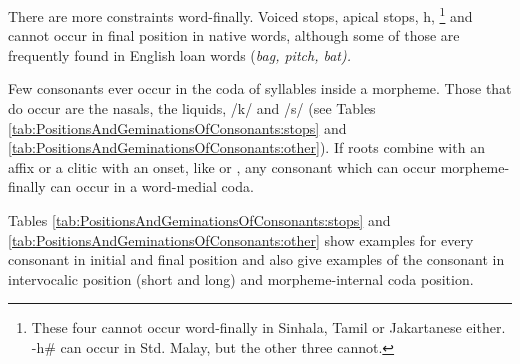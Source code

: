 There are more constraints word-finally. Voiced stops, apical stops,  h, \ny{}\footnote{These four cannot occur word-finally in Sinhala, Tamil or Jakartanese either. -h\# can occur in Std. Malay, but the other three cannot.} and \V{}  cannot occur in final position in native words, although some of those are frequently found in English loan words (\em bag, pitch, bat\em).

Few consonants ever occur in the coda of syllables inside a morpheme. Those that do occur are the nasals, the liquids, /k/ and /s/ (see Tables \ref{tab:PositionsAndGeminationsOfConsonants:stops} and \ref{tab:PositionsAndGeminationsOfConsonants:other}). If roots combine with an affix or a clitic with an onset, like  or , any consonant which can occur morpheme-finally can occur in a word-medial coda.

Tables \ref{tab:PositionsAndGeminationsOfConsonants:stops} and \ref{tab:PositionsAndGeminationsOfConsonants:other} show examples for every consonant in initial and final position and also give  examples of the consonant in intervocalic position (short and long) and morpheme-internal coda position.


